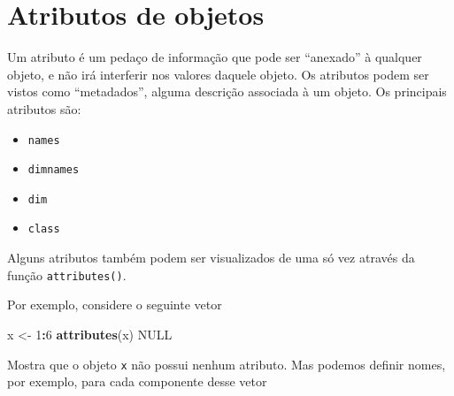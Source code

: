 \documentclass[10pt,a4paper]{book}
\newenvironment{Shaded}{\begin{snugshade}}{\end{snugshade}}
\newcommand{\KeywordTok}[1]{\textcolor[rgb]{0.13,0.29,0.53}{\textbf{#1}}}
\newcommand{\DecValTok}[1]{\textcolor[rgb]{0.00,0.00,0.81}{#1}}
\newcommand{\StringTok}[1]{\textcolor[rgb]{0.31,0.60,0.02}{#1}}
\newcommand{\OtherTok}[1]{\textcolor[rgb]{0.56,0.35,0.01}{#1}}
\newcommand{\OperatorTok}[1]{\textcolor[rgb]{0.81,0.36,0.00}{\textbf{#1}}}
\newcommand{\NormalTok}[1]{#1}
\providecommand{\tightlist}{%
  \setlength{\itemsep}{0pt}\setlength{\parskip}{0pt}}
\begin{document}
\section{Atributos de objetos}\label{atributos-de-objetos}

Um atributo é um pedaço de informação que pode ser ``anexado'' à
qualquer objeto, e não irá interferir nos valores daquele objeto. Os
atributos podem ser vistos como ``metadados'', alguma descrição
associada à um objeto. Os principais atributos são:

\begin{itemize}
\tightlist
\item
  \texttt{names}
\item
  \texttt{dimnames}
\item
  \texttt{dim}
\item
  \texttt{class}
\end{itemize}

Alguns atributos também podem ser visualizados de uma só vez através da
função \texttt{attributes()}.

Por exemplo, considere o seguinte vetor

\begin{Shaded}
\begin{Highlighting}[]
\NormalTok{x <-}\StringTok{ }\DecValTok{1}\OperatorTok{:}\DecValTok{6}
\KeywordTok{attributes}\NormalTok{(x)}
\OtherTok{NULL}
\end{Highlighting}
\end{Shaded}

Mostra que o objeto \texttt{x} não possui nenhum atributo. Mas podemos
definir nomes, por exemplo, para cada componente desse vetor

\begin{Shaded}
\end{Shaded}
\end{document}
